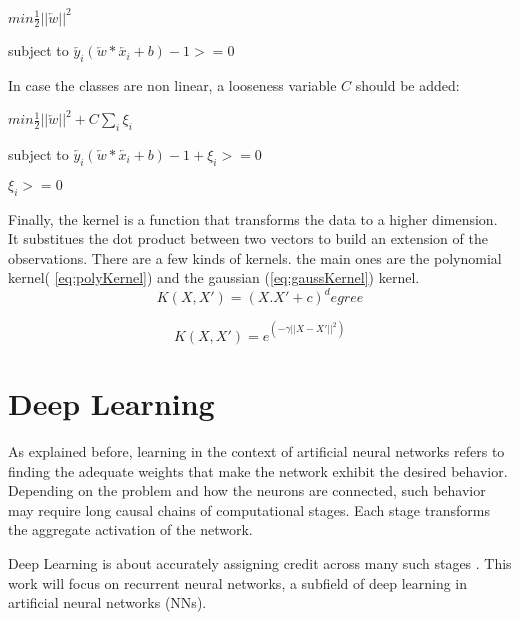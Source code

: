 \centerline{$min \frac{1}{2}||\overleftarrow{w}||^2$\\}
\centerline{subject to $\overleftarrow{y_i} (\overleftarrow{w}*\overleftarrow{x_i}+b)-1>=0$ \\}

In case the classes are non linear, a looseness variable $C$ should be added: \\
\centerline{$min \frac{1}{2}||\overleftarrow{w}||^2+C\sum_{i}\xi_i$\\}
\centerline{subject to $\overleftarrow{y_i} (\overleftarrow{w}*\overleftarrow{x_i}+b)-1+\xi_i>=0$\\}
\centerline{$\xi_i>=0$}

Finally, the kernel is a function that transforms the data to a higher dimension. It substitues the dot product between two vectors to build an extension of the observations. There are a few kinds of kernels. the main ones are the polynomial kernel( \ref{eq:polyKernel}) and the gaussian (\ref{eq:gaussKernel}) kernel.
\begin{equation} \label{eq:polyKernel}
K(X,X')=(X.X'+c)^degree
\end{equation}

\begin{equation} \label{eq:gaussKernel}
K(X,X')=e^(-\gamma ||X-X'||^2)
\end{equation}

\section{Deep Learning}
As explained before, learning in the context of artificial neural networks refers to finding the adequate weights that make the network exhibit the desired behavior. Depending on the problem and how the neurons are connected, such behavior may require long causal chains of computational stages. Each stage transforms the aggregate activation of the network.

Deep Learning is about accurately assigning credit across many such stages \cite{schmidhuber2015deep}. This work will focus on recurrent neural networks, a subfield of deep learning in artificial neural networks (NNs).

